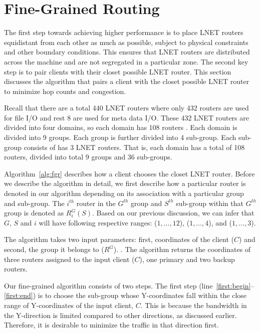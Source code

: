 \section{Fine-Grained Routing}


The first step towards achieving higher performance is to place LNET routers equidistant from each other as much as possible,
subject to physical constraints and other boundary conditions. This ensures that LNET routers are distributed across the machine
and are not segregated in a particular zone. The second key step is to pair clients with their closet possible LNET router. This 
section discusses the algorithm that pairs a client with the closet possible LNET router to minimize hop counts and congestion.

Recall that there are a total 440 LNET routers where only 432 routers are used for file I/O and rest 8 are used for meta data I/O.
These 432 LNET routers are divided into four domains, so each domain has 108 routers . Each
domain is divided into 9 groups. Each group is further divided into 4 sub-group. Each sub-group consists of has 3 LNET routers. That 
is, each domain has a total of 108 routers, divided into total 9 groups and 36 sub-groups.


Algorithm~\ref{alg:fgr} describes how a client chooses the closet LNET router. Before we describe the algorithm in detail, we first
describe how a particular router is denoted in our algorithm depending on its association with a particular group and sub-group. The 
$i^{th}$ router in the $G^{th}$ group and $S^{th}$ sub-group within that $G^{th}$ group is denoted as $R^G_{i}(S)$. Based on 
our previous discussion, we can infer that $G$, $S$ and $i$ will have following respective ranges: ($1, \dots, 12$), ($1, \dots, 4$), 
and ($1, \dots, 3$).

The algorithm takes two input parameters: first, coordinates of the client ($C$) and second, the group it belongs to ($R^G$). . The algorithm returns the coordinates of three routers assigned to the input client ($C$),
one primary and two backup routers.

Our fine-grained algorithm consists of two steps. The first step (line~\ref{first:begin}--\ref{first:end}) is to choose the sub-group whose 
Y-coordinates fall within the close range of Y-coordinates of the input client, $C$. This is because the bandwidth in the Y-direction is limited
compared to other directions, as discussed earlier. Therefore, it is desirable to minimize the traffic in that direction first. 

